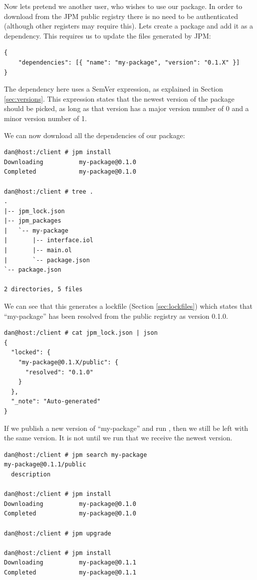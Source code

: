 Now lets pretend we another user, who wishes to use our package. In order to
download from the JPM public registry there is no need to be authenticated
(although other registers may require this). Lets create a package and add it
as a dependency. This requires us to update the  files
generated by JPM:

\begin{verbatim}
{
    "dependencies": [{ "name": "my-package", "version": "0.1.X" }]
}
\end{verbatim}

The dependency here uses a SemVer expression, as explained in Section
\ref{sec:versions}. This expression states that the newest version of the
package should be picked, as long as that version has a major version number of
0 and a minor version number of 1.

We can now download all the dependencies of our package:

\begin{verbatim}
dan@host:/client # jpm install
Downloading          my-package@0.1.0
Completed            my-package@0.1.0

dan@host:/client # tree .
.
|-- jpm_lock.json
|-- jpm_packages
|   `-- my-package
|       |-- interface.iol
|       |-- main.ol
|       `-- package.json
`-- package.json

2 directories, 5 files
\end{verbatim}

We can see that this generates a lockfile (Section \ref{sec:lockfiles}) which
states that ``my-package'' has been resolved from the public registry as
version 0.1.0.

\begin{verbatim}
dan@host:/client # cat jpm_lock.json | json
{
  "locked": {
    "my-package@0.1.X/public": {
      "resolved": "0.1.0"
    }
  },
  "_note": "Auto-generated"
}
\end{verbatim}

If we publish a new version of ``my-package'' and run , then
we still be left with the same version. It is not until we run 
that we receive the newest version.

\begin{verbatim}
dan@host:/client # jpm search my-package
my-package@0.1.1/public
  description

dan@host:/client # jpm install
Downloading          my-package@0.1.0
Completed            my-package@0.1.0

dan@host:/client # jpm upgrade

dan@host:/client # jpm install
Downloading          my-package@0.1.1
Completed            my-package@0.1.1
\end{verbatim}

